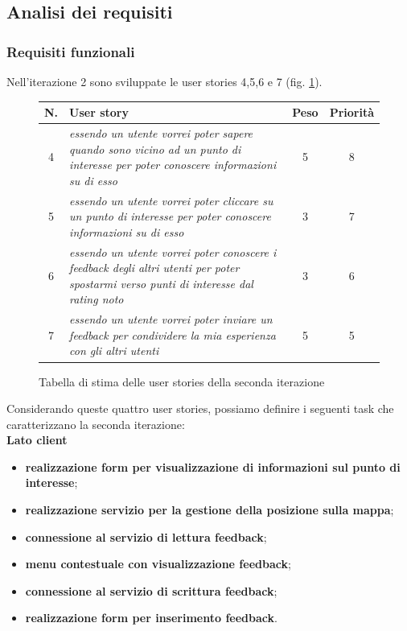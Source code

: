 \subsection{Analisi dei requisiti}

\subsubsection{Requisiti funzionali}
Nell'iterazione 2 sono sviluppate le user stories 4,5,6 e 7 (fig. \ref{userstoriestablesecondaiterazione}). 
\begin{figure}
\begin{center}
\begin{tabular}[c]{|c|p{7cm}|c|c|}
\hline
N. & User story & Peso & Priorità\\
\hline
4 & \textit{essendo un utente vorrei poter sapere quando sono vicino ad un punto di interesse per poter conoscere informazioni su di esso} & 5 & 8\\
\hline
5 & \textit{essendo un utente vorrei poter cliccare su un punto di interesse per poter conoscere informazioni su di esso} & 3 & 7\\
\hline
6 & \textit{essendo un utente vorrei poter conoscere i feedback degli altri utenti per poter spostarmi verso punti di interesse dal rating noto} & 3 & 6\\
\hline
7 & \textit{essendo un utente vorrei poter inviare un feedback per condividere la mia esperienza con gli altri utenti} & 5 & 5\\
\hline
\end{tabular}
\caption{Tabella di stima delle user stories della seconda iterazione\label{userstoriestablesecondaiterazione}}
\end{center}
\end{figure}

Considerando queste quattro user stories, possiamo definire i seguenti task che caratterizzano la seconda iterazione:\\
\textbf{Lato client}
\begin{itemize}
\item \textbf{realizzazione form per visualizzazione di informazioni sul punto di interesse};
\item \textbf{realizzazione servizio per la gestione della posizione sulla mappa};
\item \textbf{connessione al servizio di lettura feedback};
\item \textbf{menu contestuale con visualizzazione feedback};
\item \textbf{connessione al servizio di scrittura feedback};
\item \textbf{realizzazione form per inserimento feedback}.
\end{itemize}

